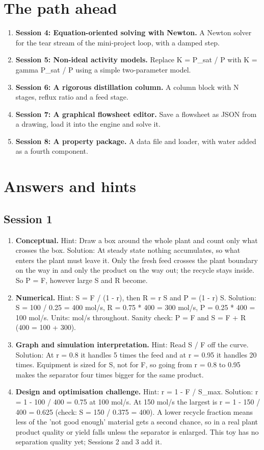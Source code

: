 \documentclass[11pt,a4paper]{article}
\begin{document}
\section{The path ahead}
\begin{enumerate}[nosep]
\item \textbf{Session 4: Equation-oriented solving with Newton.} A Newton solver for the tear stream of the mini-project loop, with a damped step.
\item \textbf{Session 5: Non-ideal activity models.} Replace K = P\_sat / P with K = gamma P\_sat / P using a simple two-parameter model.
\item \textbf{Session 6: A rigorous distillation column.} A column block with N stages, reflux ratio and a feed stage.
\item \textbf{Session 7: A graphical flowsheet editor.} Save a flowsheet as JSON from a drawing, load it into the engine and solve it.
\item \textbf{Session 8: A property package.} A data file and loader, with water added as a fourth component.
\end{enumerate}

\section{Answers and hints}

\subsection*{Session 1}
\begin{enumerate}[nosep]
\item \textbf{Conceptual.} Hint: Draw a box around the whole plant and count only what crosses the box. Solution: At steady state nothing accumulates, so what enters the plant must leave it. Only the fresh feed crosses the plant boundary on the way in and only the product on the way out; the recycle stays inside. So P = F, however large S and R become.
\item \textbf{Numerical.} Hint: S = F / (1 - r), then R = r S and P = (1 - r) S. Solution: S = 100 / 0.25 = 400 mol/s, R = 0.75 * 400 = 300 mol/s, P = 0.25 * 400 = 100 mol/s. Units: mol/s throughout. Sanity check: P = F and S = F + R (400 = 100 + 300).
\item \textbf{Graph and simulation interpretation.} Hint: Read S / F off the curve. Solution: At r = 0.8 it handles 5 times the feed and at r = 0.95 it handles 20 times. Equipment is sized for S, not for F, so going from r = 0.8 to 0.95 makes the separator four times bigger for the same product.
\item \textbf{Design and optimisation challenge.} Hint: r = 1 - F / S\_max. Solution: r = 1 - 100 / 400 = 0.75 at 100 mol/s. At 150 mol/s the largest is r = 1 - 150 / 400 = 0.625 (check: S = 150 / 0.375 = 400). A lower recycle fraction means less of the 'not good enough' material gets a second chance, so in a real plant product quality or yield falls unless the separator is enlarged. This toy has no separation quality yet; Sessions 2 and 3 add it.
\end{enumerate}
\end{document}
